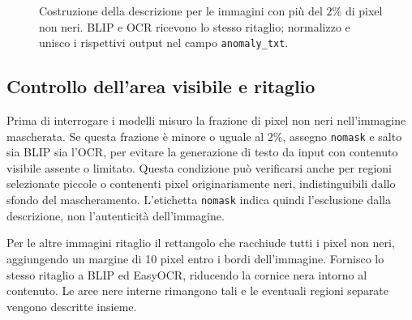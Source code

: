 \begin{figure}[htbp]
    \centering
    \caption{Costruzione della descrizione per le immagini con più del $2\%$ di pixel non neri. BLIP e OCR ricevono lo stesso ritaglio; normalizzo e unisco i rispettivi output nel campo \texttt{anomaly\_txt}.}
    \label{fig:descrizione-flusso}
\end{figure}

\subsection{Controllo dell'area visibile e ritaglio}
\label{subsec:metodi-descrizioni-input}

Prima di interrogare i modelli misuro la frazione di pixel non neri nell'immagine mascherata. Se questa frazione è minore o uguale al $2\%$, assegno \texttt{nomask} e salto sia BLIP sia l'OCR, per evitare la generazione di testo da input con contenuto visibile assente o limitato. Questa condizione può verificarsi anche per regioni selezionate piccole o contenenti pixel originariamente neri, indistinguibili dallo sfondo del mascheramento. L'etichetta \texttt{nomask} indica quindi l'esclusione dalla descrizione, non l'autenticità dell'immagine.

Per le altre immagini ritaglio il rettangolo che racchiude tutti i pixel non neri, aggiungendo un margine di 10 pixel entro i bordi dell'immagine. Fornisco lo stesso ritaglio a BLIP ed EasyOCR, riducendo la cornice nera intorno al contenuto. Le aree nere interne rimangono tali e le eventuali regioni separate vengono descritte insieme.

